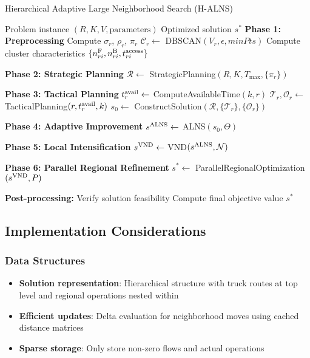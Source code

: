 \begin{algorithm}[htbp]
    \caption{Hierarchical Adaptive Large Neighborhood Search (H-ALNS)}
    \label{alg:main}
    \begin{algorithmic}[1]
        \Require Problem instance $(R, K, V, \text{parameters})$
        \Ensure Optimized solution $s^*$
        \State \textbf{Phase 1: Preprocessing}
        \State Compute $\sigma_r$, $\rho_r$, $\pi_r$
        \State $\mathcal{C}_r \leftarrow$ DBSCAN$(V_r, \epsilon, minPts)$
        \State Compute cluster characteristics $\{n_{ri}^{\text{F}}, n_{ri}^{\text{B}}, t_{ri}^{\text{access}}\}$
        \EndFor

        \State \textbf{Phase 2: Strategic Planning}
        \State $\mathcal{R} \leftarrow$ StrategicPlanning$(R, K, T_{\max}, \{\pi_r\})$

        \State \textbf{Phase 3: Tactical Planning}
        \State $t^{\text{avail}}_r \leftarrow$ ComputeAvailableTime$(k, r)$
        \State $\mathcal{T}_r, \mathcal{O}_r \leftarrow$ TacticalPlanning$(r, t^{\text{avail}}_r, k)$
        \EndFor
        \EndFor
        \State $s_0 \leftarrow$ ConstructSolution$(\mathcal{R}, \{\mathcal{T}_r\}, \{\mathcal{O}_r\})$

        \State \textbf{Phase 4: Adaptive Improvement}
        \State $s^{\text{ALNS}} \leftarrow$ ALNS$(s_0, \Theta)$

        \State \textbf{Phase 5: Local Intensification}
        \State $s^{\text{VND}} \leftarrow$ VND$(s^{\text{ALNS}}, \mathcal{N})$

        \State \textbf{Phase 6: Parallel Regional Refinement}
        \State $s^* \leftarrow$ ParallelRegionalOptimization$(s^{\text{VND}}, P)$

        \State \textbf{Post-processing:}
        \State Verify solution feasibility
        \State Compute final objective value
        \State \Return $s^*$
    \end{algorithmic}
\end{algorithm}

\subsection{Implementation Considerations}

\subsubsection{Data Structures}
\begin{itemize}
    \item \textbf{Solution representation}: Hierarchical structure with truck routes at top level and regional operations nested within
    \item \textbf{Efficient updates}: Delta evaluation for neighborhood moves using cached distance matrices
    \item \textbf{Sparse storage}: Only store non-zero flows and actual operations
\end{itemize}

